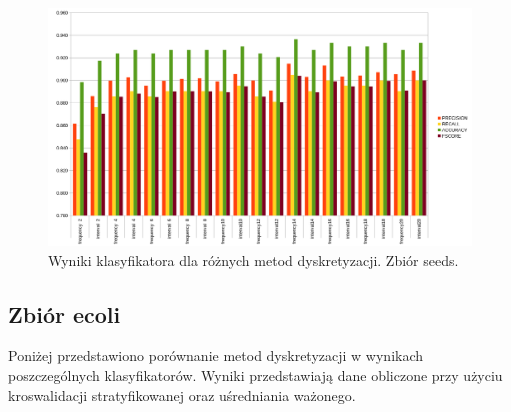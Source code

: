 \begin{figure}[H]
	\centering
		\includegraphics[width=1.0\linewidth]{disc_seeds.png}
	\caption[Wyniki klasyfikatora dla różnych metod dyskretyzacji. Zbiór seeds.]{Wyniki klasyfikatora dla różnych metod dyskretyzacji. Zbiór seeds.}
	\label{fig:disc_seeds}
\end{figure}

\subsection{Zbiór ecoli}
Poniżej przedstawiono porównanie metod dyskretyzacji w wynikach poszczególnych klasyfikatorów. Wyniki przedstawiają dane obliczone przy użyciu kroswalidacji stratyfikowanej oraz uśredniania ważonego.

